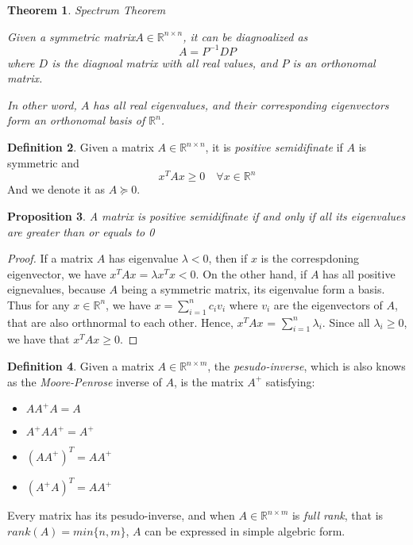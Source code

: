 \documentclass[12pt]{amsart}
\numberwithin{equation}{section}
\newtheorem{thm}{Theorem}
\newtheorem{prop}[thm]{Proposition}
\theoremstyle{definition}
\newtheorem{definition}[thm]{Definition}
\numberwithin{thm}{section}
\begin{document}
\begin{thm} Spectrum Theorem

     Given a symmetric matrix$A \in \mathbb{R}^{n \times n}$, it can be diagnoalized as \begin{equation} A = P^{-1}DP \end{equation} where $D$ is the diagnoal matrix with all real values, and $P$ is an orthonomal matrix.
     
     In other word, $A$ has all real eigenvalues, and their corresponding eigenvectors form an orthonomal basis of $\mathbb{R}^n$. \cite{golub1996matrix}
     
\end{thm} 


\begin{definition}
     Given a matrix $A \in \mathbb{R}^{n \times n}$, it is \emph{positive semidifinate} if $A$ is symmetric and \begin{equation}
          x^T A x \geq 0 \quad \forall x \in \mathbb{R}^n
     \end{equation}
     And we denote it as $A \succcurlyeq 0$.
\end{definition}

\begin{prop}
     A matrix is \emph{positive semidifinate} if and only if all its eigenvalues are greater than or equals to 0
\end{prop}

\begin{proof}
     If a matrix $A$ has eigenvalue $\lambda < 0$, then if $x$ is the correspdoning eigenvector, we have $x^T A x = \lambda x^T x < 0$.
     On the other hand, if $A$ has all positive eignevalues, because $A$ being a symmetric matrix, its eigenvalue form a basis. Thus for any $x \in \mathbb{R}^n$, we have
     $x = \sum_{i = 1} ^ n c_i v_i $ where $v_i$ are the eigenvectors of $A$, that are also orthnormal to each other.
     Hence, $x^T A x$ = $\sum_{i = 1} ^ n \lambda_i$. Since all $\lambda_i \geq 0$, we have that $x ^ T A x \geq 0$.

\end{proof}

\begin{definition}
     Given a matrix $A \in \mathbb{R}^{n \times m}$, the \emph{pesudo-inverse},
     which is also knows as the \emph{Moore-Penrose} inverse of $A$, is the matrix
     $A^+$ satisfying:
     \begin{itemize}
          \item $A A^+ A = A$
          \item $A^+ A A^+ = A^+$
          \item $(A A^+)^T = A A^+$
          \item $(A^+ A)^T = A A^+$
        \end{itemize}
     
\end{definition}
\smallskip
     Every matrix has its pesudo-inverse, and when $A \in \mathbb{R}^{n \times m}$ is \emph{full rank}, 
     that is $rank(A) = min\{n, m\}$, $A$ can be expressed in simple algebric form.
     
\end{document}
